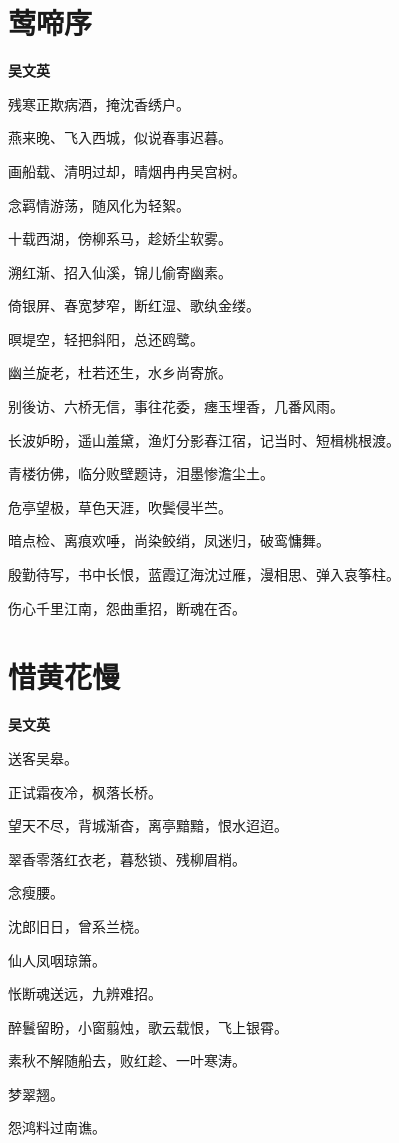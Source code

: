 \documentclass[12pt,a4paper]{ctexbook}
\begin{document}
\section{莺啼序}
\textbf{吴文英}\par\vspace{0.5em}
残寒正欺病酒，掩沈香绣户。\par
燕来晚、飞入西城，似说春事迟暮。\par
画船载、清明过却，晴烟冉冉吴宫树。\par
念羁情游荡，随风化为轻絮。\par
十载西湖，傍柳系马，趁娇尘软雾。\par
溯红渐、招入仙溪，锦儿偷寄幽素。\par
倚银屏、春宽梦窄，断红湿、歌纨金缕。\par
暝堤空，轻把斜阳，总还鸥鹭。\par
幽兰旋老，杜若还生，水乡尚寄旅。\par
别後访、六桥无信，事往花委，瘗玉埋香，几番风雨。\par
长波妒盼，遥山羞黛，渔灯分影春江宿，记当时、短楫桃根渡。\par
青楼彷佛，临分败壁题诗，泪墨惨澹尘土。\par
危亭望极，草色天涯，吹鬓侵半苎。\par
暗点检、离痕欢唾，尚染鲛绡，凤迷归，破鸾慵舞。\par
殷勤待写，书中长恨，蓝霞辽海沈过雁，漫相思、弹入哀筝柱。\par
伤心千里江南，怨曲重招，断魂在否。\par

\section{惜黄花慢}
\textbf{吴文英}\par\vspace{0.5em}
送客吴皋。\par
正试霜夜冷，枫落长桥。\par
望天不尽，背城渐杳，离亭黯黯，恨水迢迢。\par
翠香零落红衣老，暮愁锁、残柳眉梢。\par
念瘦腰。\par
沈郎旧日，曾系兰桡。\par
仙人凤咽琼箫。\par
怅断魂送远，九辨难招。\par
醉鬟留盼，小窗翦烛，歌云载恨，飞上银霄。\par
素秋不解随船去，败红趁、一叶寒涛。\par
梦翠翘。\par
怨鸿料过南谯。\par
\end{document}
